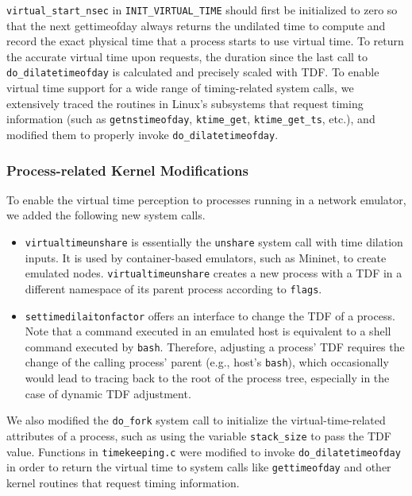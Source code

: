 \texttt{virtual\_start\_nsec} in \texttt{INIT\_VIRTUAL\_TIME} should first be initialized to zero so that the next gettimeofday always returns the undilated time to compute and record the exact physical time that a process starts to use virtual time.
To return the accurate virtual time upon requests, the duration since the last call to \texttt{do\_dilatetimeofday} is calculated and precisely scaled with TDF. To enable virtual time support for a wide range of timing-related system calls, we extensively traced the routines in Linux's subsystems that request timing information (such as \texttt{getnstimeofday}, \texttt{ktime\_get}, \texttt{ktime\_get\_ts}, etc.), and modified them to properly invoke \texttt{do\_dilatetimeofday}.


\subsubsection{Process-related Kernel Modifications}
To enable the virtual time perception to processes running in a network emulator, we added the following new system calls.
\begin{itemize}
\item \texttt{virtualtimeunshare} is essentially the \texttt{unshare} system call with time dilation inputs. It is used by container-based emulators, such as Mininet, to create emulated nodes. \texttt{virtualtimeunshare} creates a new process with a TDF in a different namespace of its parent process according to \texttt{flags}.
\item \texttt{settimedilaitonfactor} offers an interface to change the TDF of a process. Note that a command executed in an emulated host is equivalent to a shell command executed by \texttt{bash}. Therefore, adjusting a process' TDF requires the change of the calling process' parent (e.g., host's \texttt{bash}), which occasionally would lead to tracing back to the root of the process tree, especially in the case of dynamic TDF adjustment. 
\end{itemize}

We also modified the \texttt{do\_fork} system call to initialize the virtual-time-related attributes of a process, such as using the variable \texttt{stack\_size} to pass the TDF value. Functions in \texttt{timekeeping.c} were modified to invoke \texttt{do\_dilatetimeofday} in order to return the virtual time to system calls like \texttt{gettimeofday} and other kernel routines that request timing information.


